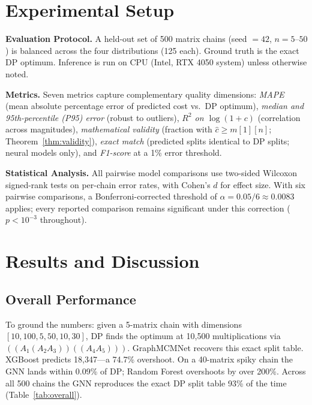 \documentclass[conference]{IEEEtran}
\begin{document}
\section{Experimental Setup}
\label{sec:setup}

\textbf{Evaluation Protocol.} A held-out set of 500 matrix chains
(seed $= 42$, $n{=}5$--$50$) is balanced across the four distributions (125
each). Ground truth is the exact DP optimum. Inference is run on CPU (Intel,
RTX 4050 system) unless otherwise noted.

\textbf{Metrics.} Seven metrics capture complementary quality dimensions:
\emph{MAPE} (mean absolute percentage error of predicted cost vs.\ DP
optimum), \emph{median and 95th-percentile (P95) error} (robust to outliers),
\emph{$R^2$ on $\log(1{+}c)$} (correlation across magnitudes),
\emph{mathematical validity} (fraction with $\hat{c} \ge m[1][n]$;
Theorem~\ref{thm:validity}), \emph{exact match} (predicted splits identical to
DP splits; neural models only), and \emph{F1-score} at a 1\% error threshold.

\textbf{Statistical Analysis.} All pairwise model comparisons use two-sided
Wilcoxon signed-rank tests on per-chain error rates, with Cohen's $d$ for
effect size. With six pairwise comparisons, a Bonferroni-corrected threshold
of $\alpha = 0.05/6 \approx 0.0083$ applies; every reported comparison remains
significant under this correction ($p < 10^{-3}$ throughout).

\section{Results and Discussion}

\subsection{Overall Performance}
To ground the numbers: given a 5-matrix chain with dimensions
$[10, 100, 5, 50, 10, 30]$, DP finds the optimum at 10{,}500 multiplications
via $((A_1(A_2A_3))((A_4A_5)))$. GraphMCMNet recovers this exact split table.
XGBoost predicts 18{,}347---a 74.7\% overshoot. On a 40-matrix spiky chain the
GNN lands within 0.09\% of DP; Random Forest overshoots by over 200\%. Across
all 500 chains the GNN reproduces the exact DP split table 93\% of the time
(Table~\ref{tab:overall}).
\end{document}
